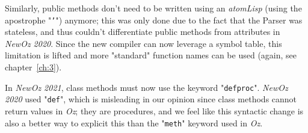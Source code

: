 Similarly, public methods don't need to be written using an \textit{atomLisp} (using the apostrophe "\texttt{'}") anymore;
this was only done due to the fact that the Parser was stateless, and thus couldn't differentiate public methods from attributes in \textit{NewOz 2020}.
Since the new compiler can now leverage a symbol table, this limitation is lifted and more "standard" function names can be used (again, see chapter~\ref{ch:3}).\newline

In \textit{NewOz 2021}, class methods must now use the keyword "\texttt{defproc}". \textit{NewOz 2020} used "\texttt{def}", which is misleading in our opinion since class methods cannot return values in \textit{Oz};
they are procedures, and we feel like this syntactic change is also a better way to explicit this than the "\texttt{meth}" keyword used in \textit{Oz}.\newline

